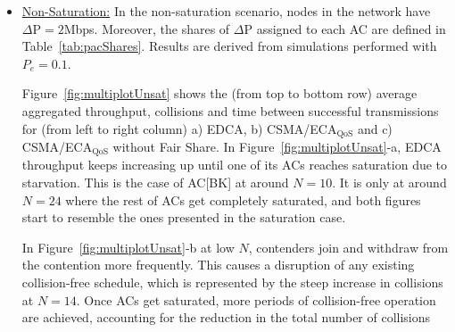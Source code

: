 \begin{itemize}
\item\underline{Non-Saturation:}
In the non-saturation scenario, nodes in the network have $\Delta\text{P}=2$Mbps. Moreover, the shares of $\Delta\text{P}$ assigned to each AC are defined in Table~\ref{tab:pacShares}. Results are derived from simulations performed with $P_e=0.1$.

Figure~\ref{fig:multiplotUnsat} shows the (from top to bottom row) average aggregated throughput, collisions and time between successful transmissions for (from left to right column) a) EDCA, b) CSMA/ECA$_{\text{QoS}}$ and c) CSMA/ECA$_{\text{QoS}}$ without Fair Share. In Figure~\ref{fig:multiplotUnsat}-a, EDCA throughput keeps increasing up until one of its ACs reaches saturation due to starvation. This is the case of AC[BK] at around $N=10$. It is only at around $N=24$ where the rest of ACs get completely saturated, and both figures start to resemble the ones presented in the saturation case.

%
%
%
%	
%
%
%	
%
In Figure~\ref{fig:multiplotUnsat}-b at low $N$, contenders join and withdraw from the contention more frequently. This causes a disruption of any existing collision-free schedule, which is represented by the steep increase in collisions at $N=14$. Once ACs get saturated, more periods of collision-free operation are achieved, accounting for the reduction in the total number of collisions\\


\end{itemize}
